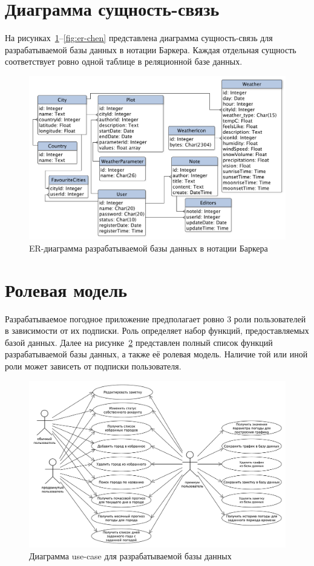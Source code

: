 \section{Диаграмма сущность-связь}
На рисунках~\ref{fig:er-barker}--\ref{fig:er-chen} представлена диаграмма сущность-связь для разрабатываемой базы данных в нотации Баркера.
Каждая отдельная сущность соответствует ровно одной таблице в реляционной базе данных.
\begin{figure}[H]
	\centering
	\includegraphics[height=0.45\textheight, width=\textwidth]{tools/img/er-barker.pdf}
	\caption{
        ER-диаграмма разрабатываемой базы данных в нотации Баркера
    }
	\label{fig:er-barker}
\end{figure}

\section{Ролевая модель}
Разрабатываемое погодное приложение предполагает ровно $3$ роли пользователей в зависимости от их подписки.
Роль определяет набор функций, предоставляемых базой данных.
Далее на рисунке~\ref{fig:use-case} представлен полный список функций разрабатываемой базы данных, а также её ролевая модель.
Наличие той или иной роли может зависеть от подписки пользователя.

\begin{figure}[H]
	\centering
	\includegraphics[height=0.4\textheight, width=\textwidth]{tools/img/db_usecase.pdf}
	\caption{
        Диаграмма use-case для разрабатываемой базы данных
    }
	\label{fig:use-case}
\end{figure}

